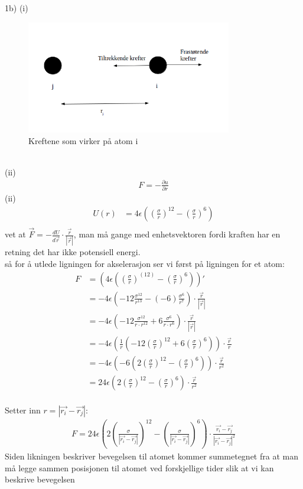 \documentclass{article}
\begin{document}
1b)
(i)\\
\begin{figure}[h!]
 \centering
  \includegraphics[width=0.80\textwidth]{Figur_2.png}
  \caption{Kreftene som virker på atom i}
\end{figure}\\
(ii)\\
\begin{align*}
F = -\frac{\partial u}{\partial r}
\end{align*}
(ii)\\
\begin{align*}
U(r) &= 4\epsilon((\frac{\sigma}{r})^12 - (\frac{\sigma}{r})^6)\\
\end{align*}
vet at $\vec{F} = -\frac{dU}{d\vec{r}} \cdot \frac{\vec{r}}{|\vec{r}|}$, man må gange med enhetsvektoren fordi kraften har en retning det har ikke potensiell energi.\\ så for å utlede ligningen for akselerasjon ser vi først på ligningen for et atom:
\begin{align*}
F &= (4\epsilon((\frac{\sigma}{r})^(12) - (\frac{\sigma}{r})^6))'\\
&= -4\epsilon(-12\frac{\sigma^12}{r^13} - (-6)\frac{\sigma^6}{r^7}) \cdot \frac{\vec{r}}{|\vec{r}|}\\
&= -4\epsilon(-12 \frac{\sigma^12}{r \cdot r^12} + 6 \frac{\sigma^6}{r \cdot r^6}) \cdot \frac{\vec{r}}{|\vec{r}|}\\
&= -4\epsilon(\frac{1}{r}(-12(\frac{\sigma}{r})^12 + 6(\frac{\sigma}{r})^6)) \cdot \frac{\vec{r}}{r}\\
&= -4\epsilon(-6(2(\frac{\sigma}{r})^12 - (\frac{\sigma}{r})^6)) \cdot \frac{\vec{r}}{r^2}\\
&= 24\epsilon(2(\frac{\sigma}{r})^12 - (\frac{\sigma}{r})^6) \cdot \frac{\vec{r}}{r^2}
\end{align*}\\
Setter inn $r = |\vec{r_i} - \vec{r_j}|$:
\begin{align*}
F = 24\epsilon(2(\frac{\sigma}{|\vec{r_i} - \vec{r_j}|})^12 - (\frac{\sigma}{|\vec{r_i}- \vec{r_j}|})^6) \cdot \frac{\vec{r_i}- \vec{r_j}}{|\vec{r_i} - \vec{r_j}|^2} 
\end{align*}
Siden likningen beskriver bevegelsen til atomet kommer summetegnet fra at man må legge sammen posisjonen til atomet ved forskjellige tider slik at vi kan beskrive bevegelsen
\end{document}
